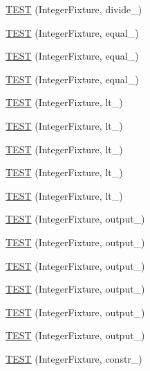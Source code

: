 \begin{DoxyCompactItemize}
\item 
\hyperlink{bmk447-TestInteger_8c_09_09_ae04cc8ff5c46119b04fed8f9ba8fa4c3}{T\-E\-S\-T} (Integer\-Fixture, divide\-\_)
\item 
\hyperlink{bmk447-TestInteger_8c_09_09_a70517ceddadbd138f71b7dcee90dddba}{T\-E\-S\-T} (Integer\-Fixture, equal\-\_)
\item 
\hyperlink{bmk447-TestInteger_8c_09_09_a05770307c102916f66ecbe5711f3a6cb}{T\-E\-S\-T} (Integer\-Fixture, equal\-\_)
\item 
\hyperlink{bmk447-TestInteger_8c_09_09_ae14c13841889110a05c40bbcb649c005}{T\-E\-S\-T} (Integer\-Fixture, equal\-\_)
\item 
\hyperlink{bmk447-TestInteger_8c_09_09_a97a0e4b149d6336dde4708d7f904b42b}{T\-E\-S\-T} (Integer\-Fixture, lt\-\_)
\item 
\hyperlink{bmk447-TestInteger_8c_09_09_a1951cfe759c7e9e571cce1ab03405d25}{T\-E\-S\-T} (Integer\-Fixture, lt\-\_)
\item 
\hyperlink{bmk447-TestInteger_8c_09_09_a65c244bbd48ca66d692ba8b5f62edba8}{T\-E\-S\-T} (Integer\-Fixture, lt\-\_)
\item 
\hyperlink{bmk447-TestInteger_8c_09_09_a8d234c9c5755af37f23c8446385e7671}{T\-E\-S\-T} (Integer\-Fixture, lt\-\_)
\item 
\hyperlink{bmk447-TestInteger_8c_09_09_a5e841294c02dc27d2190205a2386b70c}{T\-E\-S\-T} (Integer\-Fixture, lt\-\_)
\item 
\hyperlink{bmk447-TestInteger_8c_09_09_ad08b9f071ac9c9d8011036402a3137a5}{T\-E\-S\-T} (Integer\-Fixture, output\-\_)
\item 
\hyperlink{bmk447-TestInteger_8c_09_09_a49945df80ba649be1122c0ef148edcb8}{T\-E\-S\-T} (Integer\-Fixture, output\-\_)
\item 
\hyperlink{bmk447-TestInteger_8c_09_09_a1f08b7b6c024f8572a50b6a86397d280}{T\-E\-S\-T} (Integer\-Fixture, output\-\_)
\item 
\hyperlink{bmk447-TestInteger_8c_09_09_add10fb3a265027aa08abfb7008f51491}{T\-E\-S\-T} (Integer\-Fixture, output\-\_)
\item 
\hyperlink{bmk447-TestInteger_8c_09_09_a2f36ceb3def938b6eeb5f31f3821e6ec}{T\-E\-S\-T} (Integer\-Fixture, output\-\_)
\item 
\hyperlink{bmk447-TestInteger_8c_09_09_a47bcb95f876f330ef8fecf39bfea44db}{T\-E\-S\-T} (Integer\-Fixture, output\-\_)
\item 
\hyperlink{bmk447-TestInteger_8c_09_09_a70e6099d30cda377ccd29d932d0a4eb4}{T\-E\-S\-T} (Integer\-Fixture, constr\-\_)

\end{DoxyCompactItemize}
